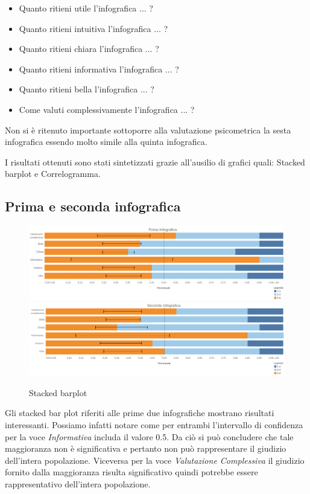 \begin{itemize}
    \item Quanto ritieni utile l'infografica ... ?
    \item Quanto ritieni intuitiva l'infografica ... ?
    \item Quanto ritieni chiara l'infografica ... ?
    \item Quanto ritieni informativa l'infografica ... ?
    \item Quanto ritieni bella l'infografica ... ?
    \item Come valuti complessivamente l'infografica ... ?
\end{itemize}

Non si è ritenuto importante sottoporre alla valutazione psicometrica la sesta infografica essendo molto simile alla quinta infografica. 

I risultati ottenuti sono stati sintetizzati grazie all'ausilio di grafici quali: Stacked barplot e Correlogramma.

\subsection{Prima e seconda infografica}

	\begin{figure}[h]
			\centering
			\includegraphics[width=1\linewidth]{imgs/vis1.png}
			\includegraphics[width=1\linewidth]{imgs/vis2.png}
			\caption{Stacked barplot}
			\label{fig:Terza infografica1}
		\end{figure}
Gli stacked bar plot riferiti alle prime due infografiche mostrano risultati interessanti. Possiamo infatti notare come per entrambi l'intervallo di confidenza per la voce \textit{Informativa} includa il valore 0.5. Da ciò si può concludere che tale maggioranza non è significativa e pertanto non può rappresentare il giudizio dell'intera popolazione. Viceversa per la voce \textit{Valutazione Complessiva} il giudizio fornito dalla maggioranza risulta significativo quindi potrebbe essere rappresentativo dell'intera popolazione. 
\newpage

